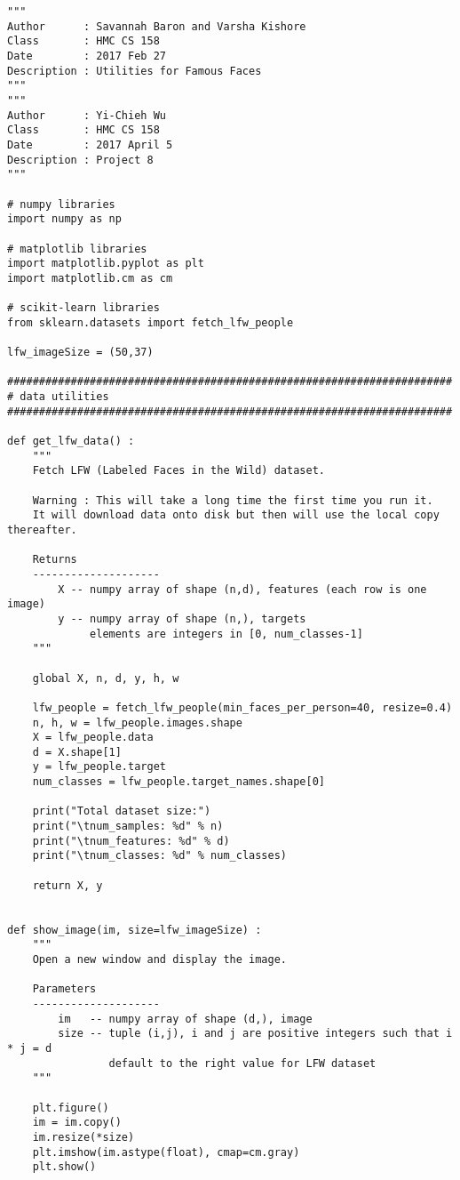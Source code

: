 \documentclass[11pt]{article}
\begin{document}
\begin{verbatim}
"""
Author      : Savannah Baron and Varsha Kishore
Class       : HMC CS 158
Date        : 2017 Feb 27
Description : Utilities for Famous Faces
"""
"""
Author      : Yi-Chieh Wu
Class       : HMC CS 158
Date        : 2017 April 5
Description : Project 8
"""

# numpy libraries
import numpy as np

# matplotlib libraries
import matplotlib.pyplot as plt
import matplotlib.cm as cm

# scikit-learn libraries
from sklearn.datasets import fetch_lfw_people

lfw_imageSize = (50,37)

######################################################################
# data utilities
######################################################################

def get_lfw_data() :
    """
    Fetch LFW (Labeled Faces in the Wild) dataset.
    
    Warning : This will take a long time the first time you run it.
    It will download data onto disk but then will use the local copy thereafter.
    
    Returns
    --------------------
        X -- numpy array of shape (n,d), features (each row is one image)
        y -- numpy array of shape (n,), targets
             elements are integers in [0, num_classes-1]
    """
    
    global X, n, d, y, h, w
    
    lfw_people = fetch_lfw_people(min_faces_per_person=40, resize=0.4)
    n, h, w = lfw_people.images.shape
    X = lfw_people.data
    d = X.shape[1]
    y = lfw_people.target
    num_classes = lfw_people.target_names.shape[0]
    
    print("Total dataset size:")
    print("\tnum_samples: %d" % n)
    print("\tnum_features: %d" % d)
    print("\tnum_classes: %d" % num_classes)
    
    return X, y


def show_image(im, size=lfw_imageSize) :
    """
    Open a new window and display the image.
    
    Parameters
    --------------------
        im   -- numpy array of shape (d,), image
        size -- tuple (i,j), i and j are positive integers such that i * j = d
                default to the right value for LFW dataset
    """
    
    plt.figure()
    im = im.copy()
    im.resize(*size)
    plt.imshow(im.astype(float), cmap=cm.gray)
    plt.show()



\end{verbatim}
\end{document}
